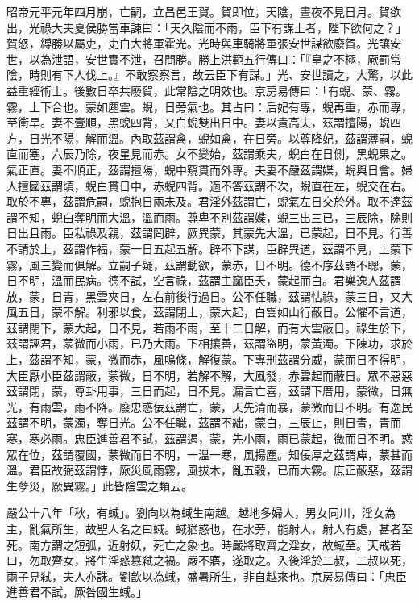 \begin{pinyinscope}
昭帝元平元年四月崩，亡嗣，立昌邑王賀。賀即位，天陰，晝夜不見日月。賀欲出，光祿大夫夏侯勝當車諫曰：「天久陰而不雨，臣下有謀上者，陛下欲何之？」賀怒，縛勝以屬吏，吏白大將軍霍光。光時與車騎將軍張安世謀欲廢賀。光讓安世，以為泄語，安世實不泄，召問勝。勝上洪範五行傳曰：「『皇之不極，厥罰常陰，時則有下人伐上。』不敢察察言，故云臣下有謀。」光、安世讀之，大驚，以此益重經術士。後數日卒共廢賀，此常陰之明效也。京房易傳曰：「有蜺、蒙、霧。霧，上下合也。蒙如塵雲。蜺，日旁氣也。其占曰：后妃有專，蜺再重，赤而專，至衝旱。妻不壹順，黑蜺四背，又白蜺雙出日中。妻以貴高夫，茲謂擅陽，蜺四方，日光不陽，解而溫。內取茲謂禽，蜺如禽，在日旁。以尊降妃，茲謂薄嗣，蜺直而塞，六辰乃除，夜星見而赤。女不變始，茲謂乘夫，蜺白在日側，黑蜺果之。氣正直。妻不順正，茲謂擅陽，蜺中窺貫而外專。夫妻不嚴茲謂媟，蜺與日會。婦人擅國茲謂頃，蜺白貫日中，赤蜺四背。適不答茲謂不次，蜺直在左，蜺交在右。取於不專，茲謂危嗣，蜺抱日兩未及。君淫外茲謂亡，蜺氣左日交於外。取不達茲謂不知，蜺白奪明而大溫，溫而雨。尊卑不別茲謂媟，蜺三出三已，三辰除，除則日出且雨。臣私祿及親，茲謂罔辟，厥異蒙，其蒙先大溫，已蒙起，日不見。行善不請於上，茲謂作福，蒙一日五起五解。辟不下謀，臣辟異道，茲謂不見，上蒙下霧，風三變而俱解。立嗣子疑，茲謂動欲，蒙赤，日不明。德不序茲謂不聰，蒙，日不明，溫而民病。德不試，空言祿，茲謂主窳臣夭，蒙起而白。君樂逸人茲謂放，蒙，日青，黑雲夾日，左右前後行過日。公不任職，茲謂怙祿，蒙三日，又大風五日，蒙不解。利邪以食，茲謂閉上，蒙大起，白雲如山行蔽日。公懼不言道，茲謂閉下，蒙大起，日不見，若雨不雨，至十二日解，而有大雲蔽日。祿生於下，茲謂誣君，蒙微而小雨，已乃大雨。下相攘善，茲謂盜明，蒙黃濁。下陳功，求於上，茲謂不知，蒙，微而赤，風鳴條，解復蒙。下專刑茲謂分威，蒙而日不得明，大臣厭小臣茲謂蔽，蒙微，日不明，若解不解，大風發，赤雲起而蔽日。眾不惡惡茲謂閉，蒙，尊卦用事，三日而起，日不見。漏言亡喜，茲謂下厝用，蒙微，日無光，有雨雲，雨不降。廢忠惑佞茲謂亡，蒙，天先清而暴，蒙微而日不明。有逸民茲謂不明，蒙濁，奪日光。公不任職，茲謂不絀，蒙白，三辰止，則日青，青而寒，寒必雨。忠臣進善君不試，茲謂遏，蒙，先小雨，雨已蒙起，微而日不明。惑眾在位，茲謂覆國，蒙微而日不明，一溫一寒，風揚塵。知佞厚之茲謂庳，蒙甚而溫。君臣故弼茲謂悖，厥災風雨霧，風拔木，亂五穀，已而大霧。庶正蔽惡，茲謂生孽災，厥異霧。」此皆陰雲之類云。

嚴公十八年「秋，有蜮」。劉向以為蜮生南越。越地多婦人，男女同川，淫女為主，亂氣所生，故聖人名之曰蜮。蜮猶惑也，在水旁，能射人，射人有處，甚者至死。南方謂之短弧，近射妖，死亡之象也。時嚴將取齊之淫女，故蜮至。天戒若曰，勿取齊女，將生淫惑篡弒之禍。嚴不寤，遂取之。入後淫於二叔，二叔以死，兩子見弒，夫人亦誅。劉歆以為蜮，盛暑所生，非自越來也。京房易傳曰：「忠臣進善君不試，厥咎國生蜮。」


\end{pinyinscope}
